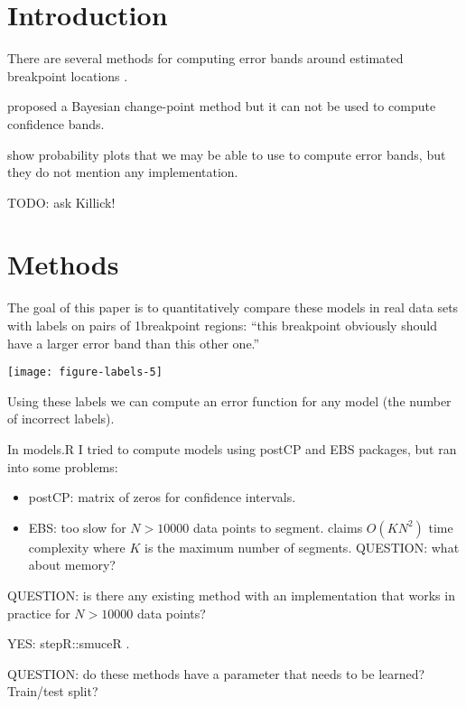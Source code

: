 \documentclass{article}
\begin{document}
\section{Introduction}

There are several methods for computing error bands around estimated
breakpoint locations \citep{Rigaill, Luong}.

\citet{Erdman} proposed a Bayesian change-point method but it can not
be used to compute confidence bands.

\citet{Nam2012,Aston2012} show probability plots that we may be able
to use to compute error bands, but they do not mention any
implementation. 

TODO: ask Killick!

\section{Methods}

The goal of this paper is to quantitatively compare these models in
real data sets with labels on pairs of 1breakpoint regions: ``this
breakpoint obviously should have a larger error band than this other
one.'' 

\texttt{[image: figure-labels-5]}

Using these labels we can compute an error function for any model (the
number of incorrect labels).

In models.R I tried to compute models using postCP and EBS packages,
but ran into some problems:
\begin{itemize}
\item postCP: matrix of zeros for confidence intervals.
\item EBS: too slow for $N>10000$ data points to
  segment. \citet{Rigaill} claims $O(KN^2)$ time complexity where $K$
  is the maximum number of segments. QUESTION: what about memory?
\end{itemize}
QUESTION: is there any existing method with an implementation that
works in practice for $N>10000$ data points?

YES: stepR::smuceR \citep{multiscale}.

QUESTION: do these methods have a parameter that needs to be learned?
Train/test split?



\end{document}
